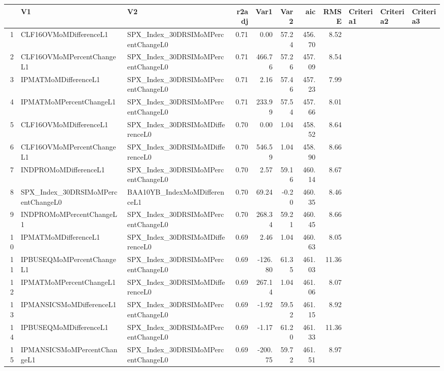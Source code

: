 \begin{longtable}{rllrrrrrlll}
  \hline
 & V1 & V2 & r2adj & Var1 & Var2 & aic & RMSE & Criteria1 & Criteria2 & Criteria3 \\ 
  \hline
1 & CLF16OVMoMDifferenceL1 & SPX\_Index\_30DRSIMoMPercentChangeL0 & 0.71 & 0.00 & 57.24 & 456.70 & 8.52 &  &  &  \\ 
  2 & CLF16OVMoMPercentChangeL1 & SPX\_Index\_30DRSIMoMPercentChangeL0 & 0.71 & 466.76 & 57.26 & 457.09 & 8.54 &  &  &  \\ 
  3 & IPMATMoMDifferenceL1 & SPX\_Index\_30DRSIMoMPercentChangeL0 & 0.71 & 2.16 & 57.46 & 457.23 & 7.99 &  &  &  \\ 
  4 & IPMATMoMPercentChangeL1 & SPX\_Index\_30DRSIMoMPercentChangeL0 & 0.71 & 233.99 & 57.54 & 457.66 & 8.01 &  &  &  \\ 
  5 & CLF16OVMoMDifferenceL1 & SPX\_Index\_30DRSIMoMDifferenceL0 & 0.70 & 0.00 & 1.04 & 458.52 & 8.64 &  &  &  \\ 
  6 & CLF16OVMoMPercentChangeL1 & SPX\_Index\_30DRSIMoMDifferenceL0 & 0.70 & 546.59 & 1.04 & 458.90 & 8.66 &  &  &  \\ 
  7 & INDPROMoMDifferenceL1 & SPX\_Index\_30DRSIMoMPercentChangeL0 & 0.70 & 2.57 & 59.16 & 460.14 & 8.67 &  &  &  \\ 
  8 & SPX\_Index\_30DRSIMoMPercentChangeL0 & BAA10YB\_IndexMoMDifferenceL1 & 0.70 & 69.24 & -0.20 & 460.35 & 8.46 &  &  &  \\ 
  9 & INDPROMoMPercentChangeL1 & SPX\_Index\_30DRSIMoMPercentChangeL0 & 0.70 & 268.34 & 59.21 & 460.45 & 8.66 &  &  &  \\ 
  10 & IPMATMoMDifferenceL1 & SPX\_Index\_30DRSIMoMDifferenceL0 & 0.69 & 2.46 & 1.04 & 460.63 & 8.05 &  &  &  \\ 
  11 & IPBUSEQMoMPercentChangeL1 & SPX\_Index\_30DRSIMoMPercentChangeL0 & 0.69 & -126.80 & 61.35 & 461.03 & 11.36 &  &  &  \\ 
  12 & IPMATMoMPercentChangeL1 & SPX\_Index\_30DRSIMoMDifferenceL0 & 0.69 & 267.14 & 1.04 & 461.06 & 8.07 &  &  &  \\ 
  13 & IPMANSICSMoMDifferenceL1 & SPX\_Index\_30DRSIMoMPercentChangeL0 & 0.69 & -1.92 & 59.52 & 461.15 & 8.92 &  &  &  \\ 
  14 & IPBUSEQMoMDifferenceL1 & SPX\_Index\_30DRSIMoMPercentChangeL0 & 0.69 & -1.17 & 61.20 & 461.33 & 11.36 &  &  &  \\ 
  15 & IPMANSICSMoMPercentChangeL1 & SPX\_Index\_30DRSIMoMPercentChangeL0 & 0.69 & -200.75 & 59.72 & 461.51 & 8.97 &  &  &  \\ 

\end{longtable}
